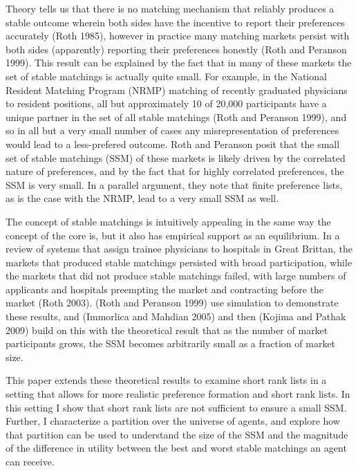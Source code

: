 \documentclass[WP]{AEA}
\begin{document}
Theory tells us that there is no matching mechanism that reliably produces a stable outcome wherein both sides have the incentive to report their preferences accurately (Roth 1985), however in practice many matching markets persist with both sides (apparently) reporting their preferences honestly  (Roth and Peranson 1999).  This result can be explained by the fact that in many of these markets the set of stable matchings is actually quite small.  For example, in the National Resident Matching Program (NRMP) matching of recently graduated physicians to resident positions, all but approximately 10 of 20,000 participants have a unique partner in the set of all stable matchings (Roth and Peranson 1999), and so in all but a very small number of cases any misrepresentation of preferences would lead to a less-prefered outcome. Roth and Peranson posit that the small set of stable matchings (SSM) of these markets is likely driven by the correlated nature of preferences, and by the fact that for highly correlated preferences, the SSM is very small.  In a parallel argument,  they note that finite preference lists, as is the case with the NRMP, lead to a very small SSM as well.  

The concept of stable matchings is intuitively appealing in the same way the concept of the core is, but it also has empirical support as an equilibrium. In a review of systems that assign trainee physicians to hospitals in Great Brittan, the markets that produced stable matchings persisted with broad participation, while the markets that did not produce stable matchings failed, with large numbers of applicants and hospitals preempting the market and contracting before the market (Roth 2003).
(Roth and Peranson 1999) use simulation to demonstrate these results, and (Immorlica and Mahdian 2005) and then (Kojima and Pathak 2009) build on this with the theoretical result that as the number of market participants grows, the SSM becomes arbitrarily small as a fraction of market size.  

This paper extends these theoretical results to examine short rank lists in a setting that allows for more realistic preference formation and short rank lists. In this setting I show that short rank lists are not sufficient to ensure a small SSM.  Further, I characterize a partition over the universe of agents, and explore how that partition can be used to understand the size of the SSM and the magnitude of the difference in utility between the best and worst stable matchings an agent can receive.
\end{document}
